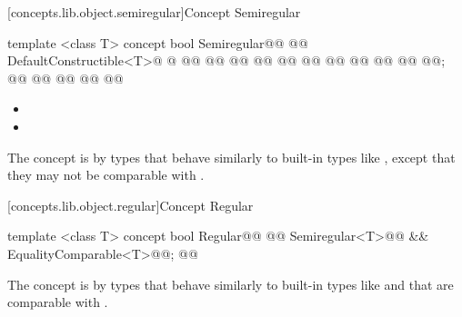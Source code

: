 \begin{addedblock}
[concepts.lib.object.semiregular]{Concept Semiregular}

%
\begin{itemdecl}
template <class T>
concept bool Semiregular@\newtxt{() \{}\oldtxt{ =}@
  @@
    DefaultConstructible<T>@\newtxt{();} \oldtxt{\&\&}@
    @@
    @@
    @@
    @@
      @@
      @@
      @@
      @@
      @@
      @@
      @@;
      @@
      @@
      @@
    @\oldtxt{\};}@
@\newtxt{\}}@
\end{itemdecl}

\begin{itemdescr}
\pnum
{}

\begin{itemize}
\item {}
\item {}
\end{itemize}

\pnum
\enternote The  concept is  by types that
 behave similarly to built-in types like , except that they may not be
comparable with \tcode{==}.\exitnote
\end{itemdescr}

[concepts.lib.object.regular]{Concept Regular}

%
\begin{itemdecl}
template <class T>
concept bool Regular@\newtxt{() \{}\oldtxt{ =}@
  @@ Semiregular<T>@\newtxt{()}@ &&
    EqualityComparable<T>@\newtxt{()}@;
@\newtxt{\}}@
\end{itemdecl}

\begin{itemdescr}
\pnum
\enternote The  concept is  by types that behave
similarly to built-in types like  and that are comparable with \tcode{==}.\exitnote
\end{itemdescr}


\end{addedblock}
